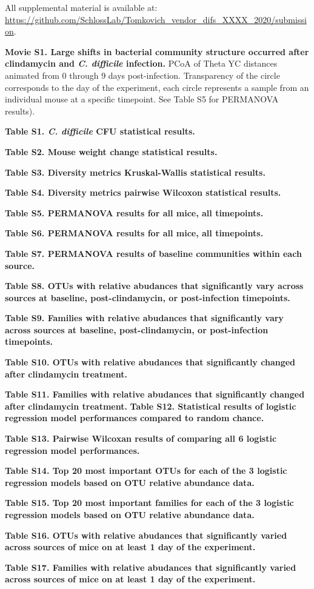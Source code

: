 \documentclass[11pt,]{article}
\begin{document}
All supplemental material is available at:
\url{https://github.com/SchlossLab/Tomkovich_vendor_difs_XXXX_2020/submission}.

\textbf{Movie S1. Large shifts in bacterial community structure occurred
after clindamycin and \emph{C. difficile} infection.} PCoA of Theta YC
distances animated from 0 through 9 days post-infection. Transparency of
the circle corresponds to the day of the experiment, each circle
represents a sample from an individual mouse at a specific timepoint.
See Table S5 for PERMANOVA results).

\textbf{Table S1. \emph{C. difficile} CFU statistical results.}

\textbf{Table S2. Mouse weight change statistical results.}

\textbf{Table S3. Diversity metrics Kruskal-Wallis statistical results.}

\textbf{Table S4. Diversity metrics pairwise Wilcoxon statistical
results.}

\textbf{Table S5. PERMANOVA results for all mice, all timepoints.}

\textbf{Table S6. PERMANOVA results for all mice, all timepoints.}

\textbf{Table S7. PERMANOVA results of baseline communities within each
source.}

\textbf{Table S8. OTUs with relative abudances that significantly vary
across sources at baseline, post-clindamycin, or post-infection
timepoints.}

\textbf{Table S9. Families with relative abudances that significantly
vary across sources at baseline, post-clindamycin, or post-infection
timepoints.}

\textbf{Table S10. OTUs with relative abudances that significantly
changed after clindamycin treatment.}

\textbf{Table S11. Families with relative abudances that significantly
changed after clindamycin treatment.} \textbf{Table S12. Statistical
results of logistic regression model performances compared to random
chance.}

\textbf{Table S13. Pairwise Wilcoxan results of comparing all 6 logistic
regression model performances.}

\textbf{Table S14. Top 20 most important OTUs for each of the 3 logistic
regression models based on OTU relative abundance data.}

\textbf{Table S15. Top 20 most important families for each of the 3
logistic regression models based on OTU relative abundance data.}

\textbf{Table S16. OTUs with relative abudances that significantly
varied across sources of mice on at least 1 day of the experiment.}

\textbf{Table S17. Families with relative abudances that significantly
varied across sources of mice on at least 1 day of the experiment.}
\end{document}
